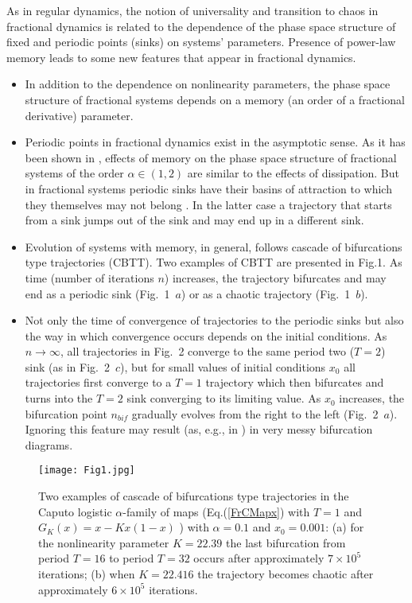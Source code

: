 \documentclass[graybox]{svmult}
\begin{document}
As in regular dynamics, the notion of universality and transition to chaos
in fractional dynamics is related to the dependence of the phase space 
structure of fixed and periodic points (sinks) on systems' parameters. 
Presence of power-law memory leads to some new features that appear in 
fractional dynamics.
\begin{itemize}
\item
{
In addition to the dependence on nonlinearity parameters, the phase space structure of fractional systems depends on a memory (an order of a fractional derivative) parameter.
}
\item
{Periodic points in fractional dynamics exist in the asymptotic sense. 
As it has been shown in \cite{ZSE}, effects of memory on the phase space 
structure of fractional systems of the order $\alpha \in (1,2)$  are 
similar to the effects of dissipation. But in fractional systems periodic 
sinks have their basins of attraction to which they themselves may not 
belong \cite{ME2,ME1,ME5}. In the latter case a trajectory that starts 
from a sink jumps out of the sink and may end up in a different sink.
}
\item
{
Evolution of systems with memory, in general, follows cascade of
bifurcations type trajectories (CBTT). Two examples of CBTT are presented 
in 
Fig.1.
As time (number of iterations $n$) increases,
the trajectory bifurcates and may end as a periodic sink
(Fig.~1~$a$) 
or as a chaotic trajectory 
(Fig.~1~$b$).   
}
\item
{
Not only the time of convergence of trajectories to the periodic sinks but also the way in which convergence occurs depends on the initial
conditions. As $n \rightarrow \infty$, all trajectories in %
Fig.~2
converge to the same period two ($T=2$) sink (as in 
Fig.~2~$c$), 
but for small 
values of initial conditions $x_0$ all
trajectories first converge to a $T=1$ trajectory which then 
bifurcates and turns into the $T=2$ sink converging to its limiting value. 
As $x_0$ increases, the bifurcation point $n_{bif}$ gradually evolves from 
the right to the left 
(Fig.~2~$a$).   
Ignoring this feature may result (as, e.g., in 
\cite{FallC,Fall}) 
in very messy bifurcation diagrams. 
}
\end{itemize}


\begin{figure}[!t]
\begin{center}
\texttt{[image: Fig1.jpg]}
\vspace{-0.25cm}
\caption{Two examples of cascade of bifurcations type trajectories in the
Caputo logistic $\alpha$-family of maps (Eq.(\ref{FrCMapx}) with $T=1$ and  
$G_K(x)=x-Kx(1-x)$ ) with $\alpha=0.1$ and $x_0=0.001$: 
(a) for the nonlinearity parameter $K=22.39$ the last bifurcation from period  
$T=16$ to period $T=32$ occurs after approximately $7 \times 10^5$ iterations; 
(b) when  $K=22.416$ the trajectory becomes chaotic after approximately 
$6 \times 10^5$ iterations.
}
\end{center}
\label{fig:1}
\end{figure}
\end{document}
